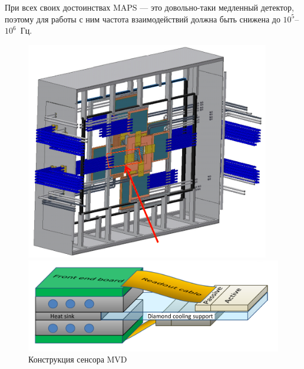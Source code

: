При всех своих достоинствах MAPS --- это довольно-таки медленный детектор, поэтому для работы с ним частота взаимодействий должна быть снижена до $10^5$--$10^6$~Гц.



\begin{figure}[H]
\begin{minipage}[b]{0.395\textwidth}
\includegraphics[width=0.95\textwidth]{pictures/MVD_2.png}
\end{minipage}
\hspace{0.01\textwidth}
\begin{minipage}[b]{0.595\textwidth}
\includegraphics[width=1.0\textwidth]{pictures/MVD_3.png}
\end{minipage}
\caption{Конструкция сенсора MVD }
\label{fig:MVD23}
\end{figure}

